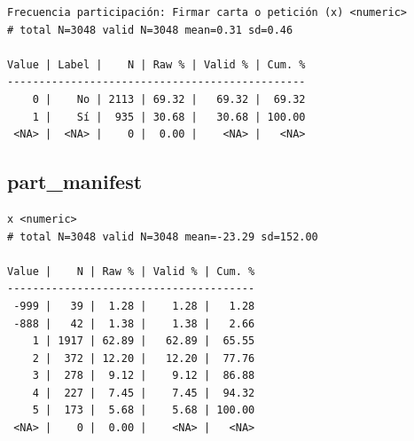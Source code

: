 \documentclass[
  letterpaper,
  DIV=11,
  numbers=noendperiod]{scrreprt}
\newenvironment{Shaded}{\begin{snugshade}}{\end{snugshade}}
\newcommand{\FunctionTok}[1]{\textcolor[rgb]{0.28,0.35,0.67}{#1}}
\newcommand{\NormalTok}[1]{\textcolor[rgb]{0.00,0.23,0.31}{#1}}
\newcommand{\SpecialCharTok}[1]{\textcolor[rgb]{0.37,0.37,0.37}{#1}}
\begin{document}
\begin{verbatim}
Frecuencia participación: Firmar carta o petición (x) <numeric> 
# total N=3048 valid N=3048 mean=0.31 sd=0.46

Value | Label |    N | Raw % | Valid % | Cum. %
-----------------------------------------------
    0 |    No | 2113 | 69.32 |   69.32 |  69.32
    1 |    Sí |  935 | 30.68 |   30.68 | 100.00
 <NA> |  <NA> |    0 |  0.00 |    <NA> |   <NA>
\end{verbatim}

\hypertarget{part_manifest}{%
\subsection{part\_manifest}\label{part_manifest}}

\begin{Shaded}
\end{Shaded}

\begin{verbatim}
x <numeric> 
# total N=3048 valid N=3048 mean=-23.29 sd=152.00

Value |    N | Raw % | Valid % | Cum. %
---------------------------------------
 -999 |   39 |  1.28 |    1.28 |   1.28
 -888 |   42 |  1.38 |    1.38 |   2.66
    1 | 1917 | 62.89 |   62.89 |  65.55
    2 |  372 | 12.20 |   12.20 |  77.76
    3 |  278 |  9.12 |    9.12 |  86.88
    4 |  227 |  7.45 |    7.45 |  94.32
    5 |  173 |  5.68 |    5.68 | 100.00
 <NA> |    0 |  0.00 |    <NA> |   <NA>
\end{verbatim}
\end{document}
